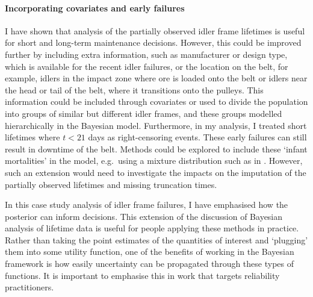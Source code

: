 \paragraph*{Incorporating covariates and early failures}
I have shown that analysis of the partially observed idler frame lifetimes is useful for short and long-term maintenance decisions. However, this could be improved further by including extra information, such as manufacturer or design type, which is available for the recent idler failures, or the location on the belt, for example, idlers in the impact zone where ore is loaded onto the belt or idlers near the head or tail of the belt, where it transitions onto the pulleys. This information could be included through covariates or used to divide the population into groups of similar but different idler frames, and these groups modelled hierarchically in the Bayesian model. Furthermore, in my analysis, I treated short lifetimes where $t < 21$ days as right-censoring events. These early failures can still result in downtime of the belt. Methods could be explored to include these `infant mortalities' in the model, e.g.\ using a mixture distribution such as in \citet{mittman2013}. However, such an extension would need to investigate the impacts on the imputation of the partially observed lifetimes and missing truncation times.

In this case study analysis of idler frame failures, I have emphasised how the posterior can inform decisions. This extension of the discussion of Bayesian analysis of lifetime data is useful for people applying these methods in practice. Rather than taking the point estimates of the quantities of interest and `plugging' them into some utility function, one of the benefits of working in the Bayesian framework is how easily uncertainty can be propagated through these types of functions. It is important to emphasise this in work that targets reliability practitioners.